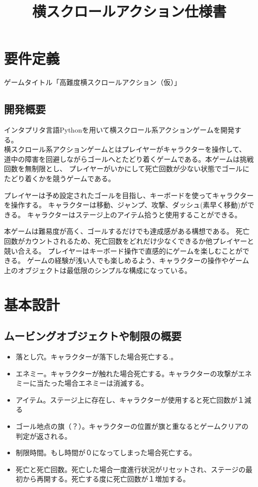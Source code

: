 \documentclass[11pt,a4paper]{jsarticle}
\title{横スクロールアクション仕様書}
\begin{document}
\maketitle

\section{要件定義}
\noindent
ゲームタイトル「高難度横スクロールアクション（仮）」

\subsection{開発概要}
インタプリタ言語Pythonを用いて横スクロール系アクションゲームを開発する。\\
横スクロール系アクションゲームとはプレイヤーがキャラクターを操作して、
道中の障害を回避しながらゴールへとたどり着くゲームである。本ゲームは挑戦回数を無制限とし、
プレイヤーがいかにして死亡回数が少ない状態でゴールにたどり着くかを競うゲームである。

プレイヤーは予め設定されたゴールを目指し、キーボードを使ってキャラクターを操作する。
キャラクターは移動、ジャンプ、攻撃、ダッシュ(素早く移動)ができる。
キャラクターはステージ上のアイテム拾うと使用することができる。

本ゲームは難易度が高く、ゴールするだけでも達成感がある構想である。
死亡回数がカウントされるため、死亡回数をどれだけ少なくできるか他プレイヤーと競い合える。
プレイヤーはキーボード操作で直感的にゲームを楽しむことができる。
ゲームの経験が浅い人でも楽しめるよう、キャラクターの操作やゲーム上のオブジェクトは最低限のシンプルな構成になっている。

\section{基本設計}
\subsection{ムービングオブジェクトや制限の概要}
\begin{itemize}
\item 落とし穴。キャラクターが落下した場合死亡する.。
\item エネミー。キャラクターが触れた場合死亡する。キャラクターの攻撃がエネミーに当たった場合エネミーは消滅する。
\item アイテム。ステージ上に存在し、キャラクターが使用すると死亡回数が１減る
\item ゴール地点の旗（？）。キャラクターの位置が旗と重なるとゲームクリアの判定が返される。
\item 制限時間。もし時間が０になってしまった場合死亡する。
\item 死亡と死亡回数。死亡した場合一度進行状況がリセットされ、ステージの最初から再開する。死亡する度に死亡回数が１増加する。
\end{itemize}
\end{document}
